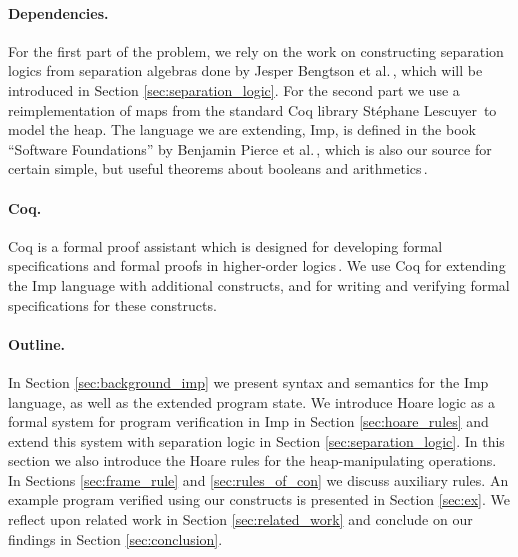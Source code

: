 \paragraph{Dependencies.}
For the first part of the problem, we rely on the work on constructing separation logics from separation algebras done by Jesper Bengtson et al.\,\cite{BirkedalL:veroop-conf}, which will be introduced in Section \ref{sec:separation_logic}. For the second part we use a reimplementation of maps from the standard Coq library Stéphane Lescuyer\,\cite{CoqContainers} to model the heap. The language we are extending, Imp, is defined in the book ``Software Foundations'' by Benjamin Pierce et al.\,\cite{Pierce:SF}, which is also our source for certain simple, but useful theorems about booleans and arithmetics\,\cite{SfLib}.

\paragraph{Coq.}
Coq is a formal proof assistant which is designed for developing formal specifications and formal proofs in higher-order logics\,\cite{CoqIntro}. We use Coq for extending the Imp language with additional constructs, and for writing and verifying formal specifications for these constructs.

\paragraph{Outline.}
In Section \ref{sec:background_imp} we present syntax and semantics for the Imp language, as well as the extended program state. We introduce Hoare logic as a formal system for program verification in Imp in Section \ref{sec:hoare_rules} and extend this system with separation logic in Section \ref{sec:separation_logic}. In this section we also introduce the Hoare rules for the heap-manipulating operations. In Sections \ref{sec:frame_rule} and \ref{sec:rules_of_con} we discuss auxiliary rules. An example program verified using our constructs is presented in Section \ref{sec:ex}. We reflect upon related work in Section \ref{sec:related_work} and conclude on our findings in Section \ref{sec:conclusion}.